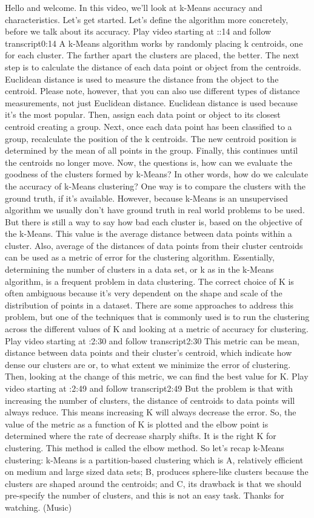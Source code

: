Hello and welcome. In this video, we'll look at k-Means accuracy and characteristics. Let's get started. Let's define the algorithm more concretely, before we talk about its accuracy.
Play video starting at ::14 and follow transcript0:14
A k-Means algorithm works by randomly placing k centroids, one for each cluster. The farther apart the clusters are placed, the better. The next step is to calculate the distance of each data point or object from the centroids. Euclidean distance is used to measure the distance from the object to the centroid. Please note, however, that you can also use different types of distance measurements, not just Euclidean distance. Euclidean distance is used because it's the most popular. Then, assign each data point or object to its closest centroid creating a group. Next, once each data point has been classified to a group, recalculate the position of the k centroids. The new centroid position is determined by the mean of all points in the group. Finally, this continues until the centroids no longer move. Now, the questions is, how can we evaluate the goodness of the clusters formed by k-Means? In other words, how do we calculate the accuracy of k-Means clustering? One way is to compare the clusters with the ground truth, if it's available. However, because k-Means is an unsupervised algorithm we usually don't have ground truth in real world problems to be used. But there is still a way to say how bad each cluster is, based on the objective of the k-Means. This value is the average distance between data points within a cluster. Also, average of the distances of data points from their cluster centroids can be used as a metric of error for the clustering algorithm. Essentially, determining the number of clusters in a data set, or k as in the k-Means algorithm, is a frequent problem in data clustering. The correct choice of K is often ambiguous because it's very dependent on the shape and scale of the distribution of points in a dataset. There are some approaches to address this problem, but one of the techniques that is commonly used is to run the clustering across the different values of K and looking at a metric of accuracy for clustering.
Play video starting at :2:30 and follow transcript2:30
This metric can be mean, distance between data points and their cluster's centroid, which indicate how dense our clusters are or, to what extent we minimize the error of clustering. Then, looking at the change of this metric, we can find the best value for K.
Play video starting at :2:49 and follow transcript2:49
But the problem is that with increasing the number of clusters, the distance of centroids to data points will always reduce. This means increasing K will always decrease the error. So, the value of the metric as a function of K is plotted and the elbow point is determined where the rate of decrease sharply shifts. It is the right K for clustering. This method is called the elbow method. So let's recap k-Means clustering: k-Means is a partition-based clustering which is A, relatively efficient on medium and large sized data sets; B, produces sphere-like clusters because the clusters are shaped around the centroids; and C, its drawback is that we should pre-specify the number of clusters, and this is not an easy task. Thanks for watching. (Music)


